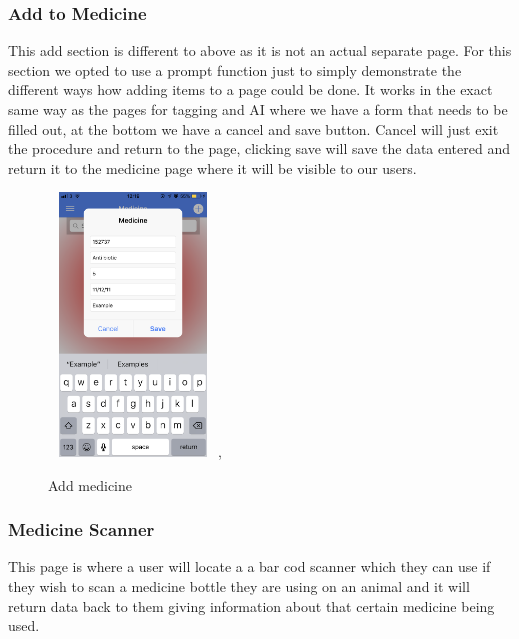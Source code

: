 \documentclass[12pt,a4paper,oneside,openany]{book}
\begin{document}
\subsubsection{Add to Medicine}
This add section is different to above as it is not an actual separate page. For this section we opted to use a prompt function just to simply demonstrate the different ways how adding items to a page could be done. It works in the exact same way as the pages for tagging and AI where we have a form that needs to be filled out, at the bottom we have a cancel and save button. Cancel will just exit the procedure and return to the page, clicking save will save the data entered and return it to the medicine page where it will be visible to our users.

\begin{figure}[ht]
\renewcommand\thefigure{5.17}
\centering
\includegraphics[width=4.5cm,height=7cm]{Images/addMed.png},
\caption{Add medicine}
\label{add Med}
\end{figure}

\newpage

\subsubsection{Medicine Scanner}
This page is where a user will locate a a bar cod scanner which they can use if they wish to scan a medicine bottle they are using on an animal and it will return data back to them giving information about that certain medicine being used.
\end{document}
